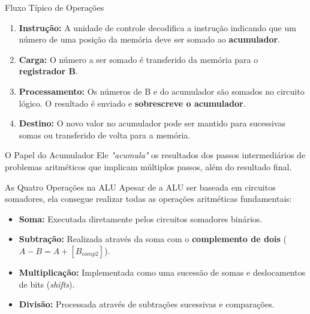 \begin{frame}{Fluxo Típico de Operações}
    \begin{enumerate}
        \item \textbf{Instrução:} A unidade de controle decodifica a instrução indicando que um número de uma posição da memória deve ser somado ao \textbf{acumulador}.
        \item \textbf{Carga:} O número a ser somado é transferido da memória para o \textbf{registrador B}.
        \item \textbf{Processamento:} Os números de B e do acumulador são somados no circuito lógico. O resultado é enviado e \textbf{sobrescreve o acumulador}.
        \item \textbf{Destino:} O novo valor no acumulador pode ser mantido para sucessivas somas ou transferido de volta para a memória.
    \end{enumerate}

    \begin{alertblock}{O Papel do Acumulador}
        Ele \textit{"acumula"} os resultados dos passos intermediários de problemas aritméticos que implicam múltiplos passos, além do resultado final.
    \end{alertblock}
\end{frame}

\begin{frame}{As Quatro Operações na ALU}
    Apesar de a ALU ser baseada em circuitos somadores, ela consegue realizar todas as operações aritméticas fundamentais:

    \begin{itemize}
        \item \textbf{Soma:} Executada diretamente pelos circuitos somadores binários.
        \item \textbf{Subtração:} Realizada através da soma com o \textbf{complemento de dois} ($A - B = A + [B_{comp2}]$).
        \item \textbf{Multiplicação:} Implementada como uma sucessão de somas e deslocamentos de bits (\textit{shifts}).
        \item \textbf{Divisão:} Processada através de subtrações sucessivas e comparações.
    \end{itemize}

\end{frame}

